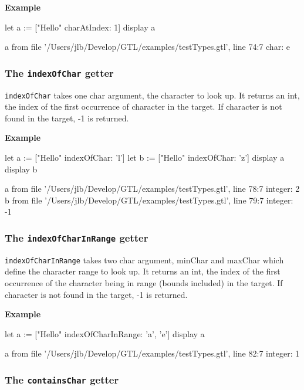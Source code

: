 \documentclass[10pt,openright,twosides,final]{memoir}
\newcommand{\icst}[1]{{\footnotesize\ttfamily\colorbox{light-blue}{#1}}}
\newcommand{\gtlarg}[1]{{\footnotesize\ttfamily\colorbox{light-blue}{#1}}}
\newcommand{\gtlinline}[1]{\colorbox{light-blue}{\lstinline[language=gtl]{#1}}}
\newcommand{\example}{\vspace{.75em}\noindent\textbf{Example}\vspace{0em}}
\begin{document}
\example
\begin{gtl}
let a := ["Hello" charAtIndex: 1]
display a
\end{gtl}
\begin{console}
a from file '/Users/jlb/Develop/GTL/examples/testTypes.gtl', line 74:7
    char: e
\end{console}


\subsubsection{The \texttt{indexOfChar} getter}

\gtlinline{indexOfChar} takes one char argument, the \gtlarg{character} to look up. It returns an int, the index of the first occurrence of \gtlarg{character} in the target. If \gtlarg{character} is not found in the target, \icst{-1} is returned.

\example
\begin{gtl}
let a := ["Hello" indexOfChar: 'l']
let b := ["Hello" indexOfChar: 'z']
display a
display b
\end{gtl}
\begin{console}
a from file '/Users/jlb/Develop/GTL/examples/testTypes.gtl', line 78:7
    integer: 2
b from file '/Users/jlb/Develop/GTL/examples/testTypes.gtl', line 79:7
    integer: -1
\end{console}

\subsubsection{The \texttt{indexOfCharInRange} getter}

\gtlinline{indexOfCharInRange} takes two char argument, \gtlarg{minChar} and \gtlarg{maxChar} which define the character range to look up. It returns an int, the index of the first occurrence of the character being in range (bounds included) in the target. If \gtlarg{character} is not found in the target, \icst{-1} is returned.

\example
\begin{gtl}
let a := ["Hello" indexOfCharInRange: 'a', 'e']
display a
\end{gtl}
\begin{console}
a from file '/Users/jlb/Develop/GTL/examples/testTypes.gtl', line 82:7
    integer: 1
\end{console}

\subsubsection{The \texttt{containsChar} getter}
\end{document}
